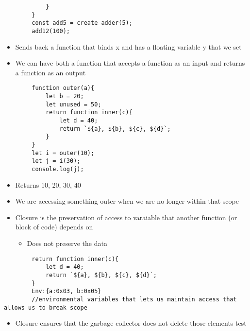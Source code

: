 \documentclass{article}
\begin{document}
\begin{itemize}
\begin{lstlisting}
            }
        }
        const add5 = create_adder(5);
        add12(100);
    \end{lstlisting}
    \begin{itemize}
        \item Sends back a function that binds x and has a floating variable y that we set
        \item We can have both a function that accepts a function as an input and returns a function as an output
    \end{itemize}
    \begin{lstlisting}
        function outer(a){
            let b = 20;
            let unused = 50;
            return function inner(c){
                let d = 40;
                return `${a}, ${b}, ${c}, ${d}`;
            }
        }
        let i = outer(10);
        let j = i(30);
        console.log(j);
    \end{lstlisting}
    \begin{itemize}
        \item Returns 10, 20, 30, 40
        \item We are accessing something outer when we are no longer within that scope
        \item Closure is the preservation of access to varaiable that another function (or block of code) depends on 
        \begin{itemize}
            \item Does not preserve the data
        \end{itemize}
    \end{itemize}
    \begin{lstlisting}
        return function inner(c){
            let d = 40;
            return `${a}, ${b}, ${c}, ${d}`;
        }
        Env:{a:0x03, b:0x05}
        //environmental variables that lets us maintain access that allows us to break scope
    \end{lstlisting}
    \begin{itemize}
        \item Closure ensures that the garbage collector does not delete those elements test
    \end{itemize}
\end{itemize}
\end{document}
